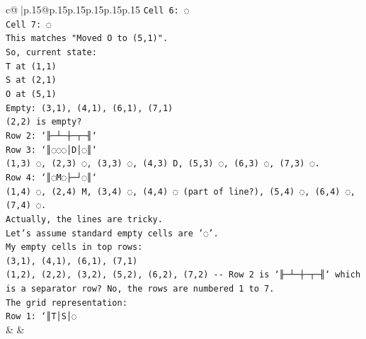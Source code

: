 \documentclass{article}
\begin{document}
{\begin{supertabular}{c@{$\;$}|p{.15\linewidth}@{}p{.15\linewidth}p{.15\linewidth}p{.15\linewidth}p{.15\linewidth}p{.15\linewidth}}
{{{\texttt{Cell 6: ◌} \\
\texttt{Cell 7: ◌} \\
\texttt{This matches "Moved O to (5,1)".} \\
\texttt{So, current state:} \\
\texttt{T at (1,1)} \\
\texttt{S at (2,1)} \\
\texttt{O at (5,1)} \\
\texttt{Empty: (3,1), (4,1), (6,1), (7,1)} \\
\texttt{(2,2) is empty?} \\
\texttt{Row 2: `╟─┴─┼─┬─╢`} \\
\texttt{Row 3: `║◌◌◌│D│◌║`} \\
\texttt{(1,3) ◌, (2,3) ◌, (3,3) ◌, (4,3) D, (5,3) ◌, (6,3) ◌, (7,3) ◌.} \\
\texttt{Row 4: `║◌M◌├─┘◌║`} \\
\texttt{(1,4) ◌, (2,4) M, (3,4) ◌, (4,4) ◌ (part of line?), (5,4) ◌, (6,4) ◌, (7,4) ◌.} \\
\texttt{Actually, the lines are tricky.} \\
\texttt{Let's assume standard empty cells are '◌'.} \\
\texttt{My empty cells in top rows:} \\
\texttt{(3,1), (4,1), (6,1), (7,1)} \\
\texttt{(1,2), (2,2), (3,2), (5,2), (6,2), (7,2) {-}{-} Row 2 is `╟─┴─┼─┬─╢` which is a separator row? No, the rows are numbered 1 to 7.} \\
\texttt{The grid representation:} \\
\texttt{Row 1: `║T│S│◌} \\
            }
        }
    }
    & & \\ \\


\end{supertabular}}
\end{document}
